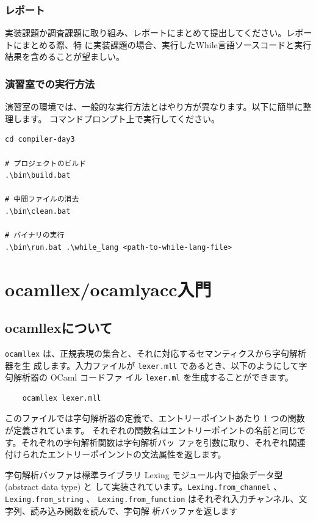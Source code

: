 \documentclass[a4paper,11pt]{jsarticle}
\begin{document}
\subsubsection{レポート}

実装課題か調査課題に取り組み、レポートにまとめて提出してください。レポートにまとめる際、特
に実装課題の場合、実行したWhile言語ソースコードと実行結果を含めることが望ましい。

\subsubsection{演習室での実行方法}

演習室の環境では、一般的な実行方法とはやり方が異なります。以下に簡単に整理します。
コマンドプロンプト上で実行してください。

\begin{lstlisting}
cd compiler-day3

# プロジェクトのビルド
.\bin\build.bat

# 中間ファイルの消去
.\bin\clean.bat

# バイナリの実行
.\bin\run.bat .\while_lang <path-to-while-lang-file>
\end{lstlisting}

\newpage
\section{ocamllex/ocamlyacc入門}
\label{intro_lex_yacc}

\subsection{ocamllexについて}

\verb|ocamllex| は、正規表現の集合と、それに対応するセマンティクスから字句解析器を生
成します。入力ファイルが \verb|lexer.mll| であるとき、以下のようにして字句解析器の OCaml
コードファ イル \verb|lexer.ml| を生成することができます。

\begin{lstlisting}
    ocamllex lexer.mll
\end{lstlisting}

このファイルでは字句解析器の定義で、エントリーポイントあたり 1 つの関数が定義されています。
それぞれの関数名はエントリーポイントの名前と同じです。それぞれの字句解析関数は字句解析バッ
ファを引数に取り、それぞれ関連付けられたエントリーポインントの文法属性を返します。

字句解析バッファは標準ライブラリ Lexing モジュール内で抽象データ型 (abstract data type) と
して実装されています。\verb|Lexing.from_channel| 、\verb|Lexing.from_string| 、
\verb|Lexing.from_function| はそれぞれ入力チャンネル、文字列、読み込み関数を読んで、字句解
析バッファを返します
\end{document}
